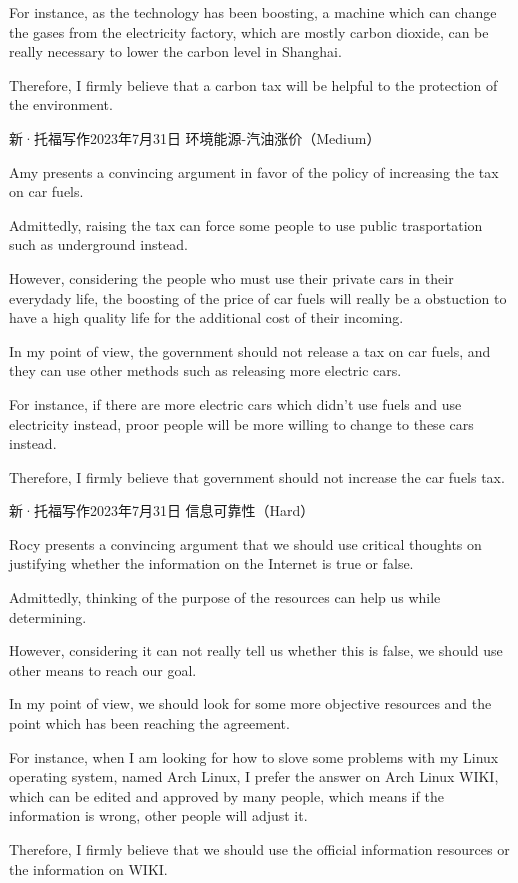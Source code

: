 For instance, as the technology has been boosting, a machine which can change the gases from the electricity factory, which are mostly carbon dioxide, can be really necessary to lower the carbon level in Shanghai.

Therefore, I firmly believe that a carbon tax will be helpful to the protection of the environment.

新·托福写作2023年7月31日 环境能源-汽油涨价（Medium）

Amy presents a convincing argument in favor of the policy of increasing the tax on car fuels.

Admittedly, raising the tax can force some people to use public trasportation such as underground instead.

However, considering the people who must use their private cars in their everydady life, the boosting of the price of car fuels will really be a obstuction to have a high quality life for the additional cost of their incoming.

In my point of view, the government should not release a tax on car fuels, and they can use other methods such as releasing more electric cars.

For instance, if there are more electric cars which didn't use fuels and use electricity instead, proor people will be more willing to change to these cars instead.

Therefore, I firmly believe that government should not increase the car fuels tax.

新·托福写作2023年7月31日 信息可靠性（Hard）

Rocy presents a convincing argument that we should use critical thoughts on justifying whether the information on the Internet is true or false.

Admittedly, thinking of the purpose of the resources can help us while determining.

However, considering it can not really tell us whether this is false, we should use other means to reach our goal.

In my point of view, we should look for some more objective resources and the point which has been reaching the agreement.

For instance, when I am looking for how to slove some problems with my Linux operating system, named Arch Linux, I prefer the answer on Arch Linux WIKI, which can be edited and approved by many people, which means if the information is wrong, other people will adjust it.

Therefore, I firmly believe that we should use the official information resources or the information on WIKI.

